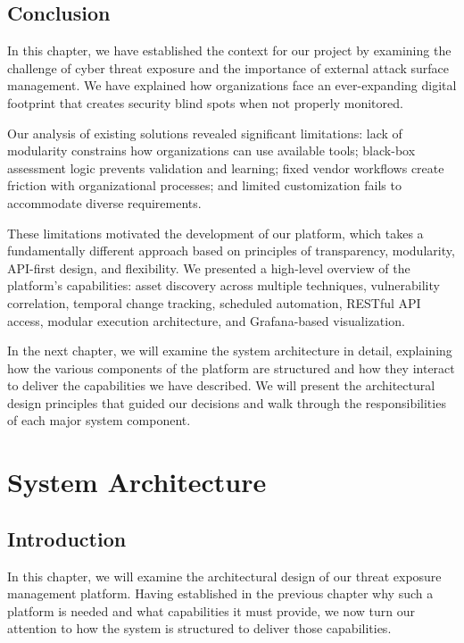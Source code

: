 \documentclass[a4paper,12pt]{report}
\begin{document}
\section*{Conclusion}

In this chapter, we have established the context for our project by examining the challenge of cyber threat exposure and the importance of external attack surface management. We have explained how organizations face an ever-expanding digital footprint that creates security blind spots when not properly monitored.\hfill \break

Our analysis of existing solutions revealed significant limitations: lack of modularity constrains how organizations can use available tools; black-box assessment logic prevents validation and learning; fixed vendor workflows create friction with organizational processes; and limited customization fails to accommodate diverse requirements.\hfill \break

These limitations motivated the development of our platform, which takes a fundamentally different approach based on principles of transparency, modularity, API-first design, and flexibility. We presented a high-level overview of the platform's capabilities: asset discovery across multiple techniques, vulnerability correlation, temporal change tracking, scheduled automation, RESTful API access, modular execution architecture, and Grafana-based visualization.\hfill \break

In the next chapter, we will examine the system architecture in detail, explaining how the various components of the platform are structured and how they interact to deliver the capabilities we have described. We will present the architectural design principles that guided our decisions and walk through the responsibilities of each major system component.\hfill \break


\chapter{System Architecture}
\thispagestyle{plain}
\section*{Introduction}
In this chapter, we will examine the architectural design of our threat exposure management platform. Having established in the previous chapter why such a platform is needed and what capabilities it must provide, we now turn our attention to how the system is structured to deliver those capabilities.\hfill \break
\end{document}
